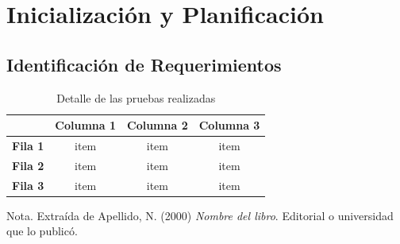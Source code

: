 \chapter{Inicialización y Planificación}

\section{Identificación de Requerimientos}

\begin{table}[H]
    \caption{Detalle de las pruebas realizadas}
    \label{tabla:ejemplo}
    \begin{center}
        \begin{tabular}{c|c|c|c|}
            \cline{2-4}
            & \textbf{Columna 1} & \textbf{Columna 2} & \textbf{Columna 3} \\ \hline
            \multicolumn{1}{|c|}{\textbf{Fila 1}} & item               & item               & item               \\ \hline
            \multicolumn{1}{|c|}{\textbf{Fila 2}} & item               & item               & item               \\ \hline
            \multicolumn{1}{|c|}{\textbf{Fila 3}} & item               & item               & item               \\ \hline
        \end{tabular}
    \end{center}
    Nota. Extraída de Apellido, N. (2000) \textit{Nombre del libro}.
    Editorial o universidad que lo publicó.
\end{table}
